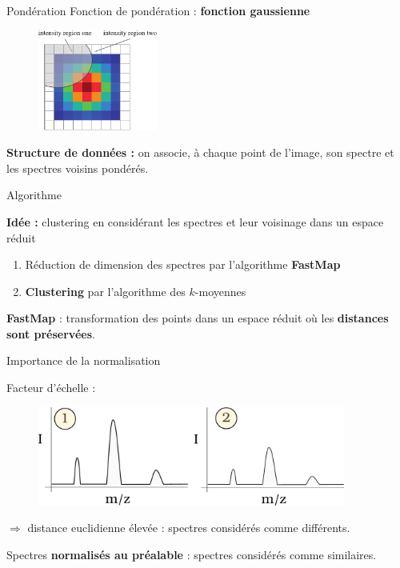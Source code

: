 \documentclass[10pt]{beamer}
\begin{document}

\begin{frame}{Pondération}
  Fonction de pondération : \textbf{fonction gaussienne}

  \begin{figure}[ht]
    \centering
    \includegraphics[width=0.35\textwidth]{fig/weights_gauss}
  \end{figure}

  \textbf{Structure de données :} on associe, à chaque point de l'image, son spectre et les spectres voisins pondérés.

\end{frame}


\begin{frame}{Algorithme}
  

  \textbf{Idée :} clustering en considérant les spectres et leur voisinage dans un espace réduit
  \begin{enumerate}
  \item Réduction de dimension des spectres par l'algorithme \textbf{FastMap}
  \item \textbf{Clustering} par l'algorithme des $k$-moyennes
  \end{enumerate}

\vspace{0.4cm}  

\textbf{FastMap} \cite{Faloutsos_1995} : transformation des points dans un espace réduit où les \textbf{distances sont préservées}.


\end{frame}

\begin{frame}{Importance de la normalisation}

  Facteur d'échelle :
  \begin{figure}[ht]
    \centering
    \includegraphics[width=0.9\textwidth]{fig/clustering_norm}
    \caption{}
    \label{fig:clustering_norm}
  \end{figure}
  
  \vspace{-0.5cm}
  $\Rightarrow$ distance euclidienne élevée : spectres considérés comme différents.

  Spectres \textbf{normalisés au préalable} : spectres considérés comme similaires.

\end{frame}
\end{document}
